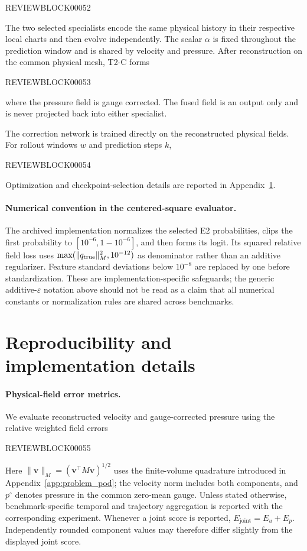 \documentclass{article}
\begin{document}
REVIEWBLOCK00052



The two selected specialists encode the same physical history in their
respective local charts and then evolve independently.
The scalar $\alpha$ is fixed throughout the prediction window and is shared
by velocity and pressure.
After reconstruction on the common physical mesh, T2-C forms


REVIEWBLOCK00053


where the pressure field is gauge corrected.
The fused field is an output only and is never projected back into either
specialist.

The correction network is trained directly on the reconstructed physical
fields. For rollout windows $w$ and prediction steps $k$,


REVIEWBLOCK00054


Optimization and checkpoint-selection details are reported in
Appendix~\ref{app:implementation}.

\paragraph{Numerical convention in the centered-square evaluator.}
The archived implementation normalizes the selected E2 probabilities, clips the first probability to $[10^{-6},1-10^{-6}]$, and then forms its logit. Its squared relative field loss uses $\max(\|q_{\rm true}\|_M^2,10^{-12})$ as denominator rather than an additive regularizer. Feature standard deviations below $10^{-8}$ are replaced by one before standardization. These are implementation-specific safeguards; the generic additive-$\varepsilon$ notation above should not be read as a claim that all numerical constants or normalization rules are shared across benchmarks.

\section{Reproducibility and implementation details}
\label{app:implementation}

\paragraph{Physical-field error metrics.}
We evaluate reconstructed velocity and gauge-corrected pressure using the relative weighted field errors


REVIEWBLOCK00055


Here $\|\bm v\|_M=(\bm v^\top M\bm v)^{1/2}$ uses the finite-volume
quadrature introduced in Appendix~\ref{app:problem_pod}; the velocity norm includes both components, and $p^\circ$ denotes pressure in the common zero-mean gauge. Unless stated otherwise, benchmark-specific temporal and trajectory aggregation is reported with the corresponding experiment. Whenever a joint score is reported,
$E_{\mathrm{joint}}=E_u+E_p$. Independently rounded component values may therefore differ slightly from the displayed joint score.
\end{document}
